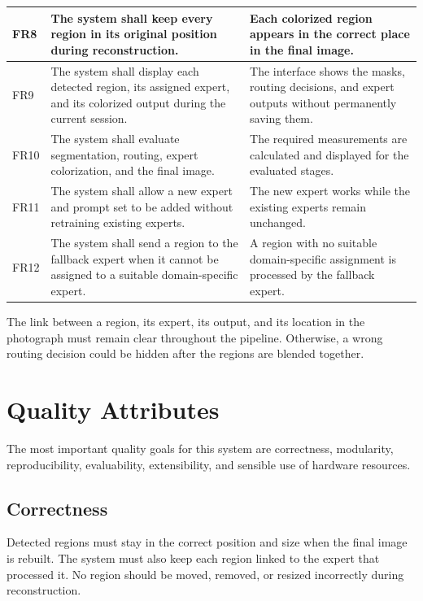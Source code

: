 \documentclass{FastFyp}
\begin{document}
\begin{longtable}{|p{1.2cm}|p{7.1cm}|p{6.0cm}|}
FR8 &
The system shall keep every region in its original position during reconstruction. &
Each colorized region appears in the correct place in the final image. \\ \hline

FR9 &
The system shall display each detected region, its assigned expert, and its colorized output during the current session. &
The interface shows the masks, routing decisions, and expert outputs without permanently saving them. \\ \hline

FR10 &
The system shall evaluate segmentation, routing, expert colorization, and the final image. &
The required measurements are calculated and displayed for the evaluated stages. \\ \hline

FR11 &
The system shall allow a new expert and prompt set to be added without retraining existing experts. &
The new expert works while the existing experts remain unchanged. \\ \hline

FR12 &
The system shall send a region to the fallback expert when it cannot be assigned to a suitable domain-specific expert. &
A region with no suitable domain-specific assignment is processed by the fallback expert. \\ \hline

\end{longtable}

The link between a region, its expert, its output, and its location in the photograph must remain clear throughout the pipeline. Otherwise, a wrong routing decision could be hidden after the regions are blended together.

\section{Quality Attributes}

The most important quality goals for this system are correctness, modularity, reproducibility, evaluability, extensibility, and sensible use of hardware resources.

\subsection{Correctness}

Detected regions must stay in the correct position and size when the final image is rebuilt. The system must also keep each region linked to the expert that processed it. No region should be moved, removed, or resized incorrectly during reconstruction.
\end{document}
